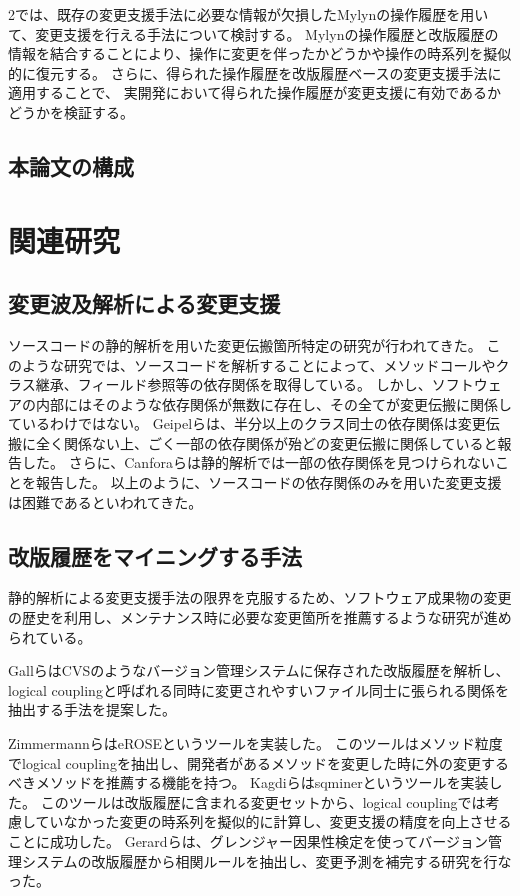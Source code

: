 \documentclass[a4paper]{jsbook}
\begin{document}
2では、既存の変更支援手法に必要な情報が欠損したMylynの操作履歴を用いて、変更支援を行える手法について検討する。
Mylynの操作履歴と改版履歴の情報を結合することにより、操作に変更を伴ったかどうかや操作の時系列を擬似的に復元する。
さらに、得られた操作履歴を改版履歴ベースの変更支援手法に適用することで、
実開発において得られた操作履歴が変更支援に有効であるかどうかを検証する。
\section{本論文の構成}
\chapter{関連研究}
\section{変更波及解析による変更支援}
ソースコードの静的解析を用いた変更伝搬箇所特定の研究が行われてきた\cite{792645}。
このような研究では、ソースコードを解析することによって、メソッドコールやクラス継承、フィールド参照等の依存関係を取得している。
しかし、ソフトウェアの内部にはそのような依存関係が無数に存在し、その全てが変更伝搬に関係しているわけではない。
Geipelら\cite{Geipel:2009}は、半分以上のクラス同士の依存関係は変更伝搬に全く関係ない上、ごく一部の依存関係が殆どの変更伝搬に関係していると報告した。
さらに、Canforaら\cite{5609732}は静的解析では一部の依存関係を見つけられないことを報告した。
以上のように、ソースコードの依存関係のみを用いた変更支援は困難であるといわれてきた。

\section{改版履歴をマイニングする手法}
静的解析による変更支援手法の限界を克服するため、ソフトウェア成果物の変更の歴史を利用し、メンテナンス時に必要な変更箇所を推薦するような研究が進められている。

Gallら\cite{738508}はCVSのようなバージョン管理システムに保存された改版履歴を解析し、logical couplingと呼ばれる同時に変更されやすいファイル同士に張られる関係を抽出する手法を提案した。

ZimmermannらはeROSEというツール\cite{Zimmermann:2005}を実装した。
このツールはメソッド粒度でlogical couplingを抽出し、開発者があるメソッドを変更した時に外の変更するべきメソッドを推薦する機能を持つ。
Kagdiらはsqminerというツール\cite{Kagdi:2006}を実装した。
このツールは改版履歴に含まれる変更セットから、logical couplingでは考慮していなかった変更の時系列を擬似的に計算し、変更支援の精度を向上させることに成功した。
Gerardら\cite{5609732}は、グレンジャー因果性検定を使ってバージョン管理システムの改版履歴から相関ルールを抽出し、変更予測を補完する研究を行なった。
\end{document}
